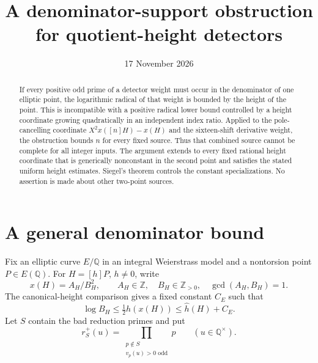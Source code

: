 \documentclass[11pt,a4paper]{article}
\title{A denominator-support obstruction for quotient-height detectors}
\author{}\date{17 November 2026}
\newcommand{\Q}{\mathbb Q}\newcommand{\Z}{\mathbb Z}
\begin{document}
\maketitle

\begin{abstract}
If every positive odd prime of a detector weight must occur in the
denominator of one elliptic point, the logarithmic radical of that
weight is bounded by the height of the point. This is incompatible
with a positive radical lower bound controlled by a height coordinate
growing quadratically in an independent index ratio. Applied to the
pole-cancelling coordinate $X^2x([n]H)-x(H)$ and the sixteen-shift
derivative weight, the obstruction bounds $n$ for every fixed source.
Thus that combined source cannot be complete for all integer inputs.
The argument extends to every fixed rational height coordinate that
is generically nonconstant in the second point and satisfies the
stated uniform height estimates. Siegel's theorem controls the
constant specializations. No assertion is made about other
two-point sources.
\end{abstract}

\section{A general denominator bound}

Fix an elliptic curve $E/\Q$ in an integral Weierstrass model and
a nontorsion point $P\in E(\Q)$. For $H=[h]P$, $h\ne0$, write
\[
                    x(H)=A_H/B_H^2,
             \qquad A_H\in\Z,\quad B_H\in\Z_{>0},
             \quad\gcd(A_H,B_H)=1.
\]
The canonical-height comparison \cite[Chapter VIII, Section 9]{AEC}
gives a fixed constant $C_E$ such that
\begin{equation}\label{eq:denominator-upper}
                 \log B_H\le\tfrac12h(x(H))
                                  \le\widehat h(H)+C_E.
\end{equation}
Let $S$ contain the bad reduction primes and put
\[
            r_S^+(u)=\prod_{\substack{p\notin S\\v_p(u)>0\text{ odd}}}p
                       \qquad(u\in\Q^\times).
\]
\end{document}
